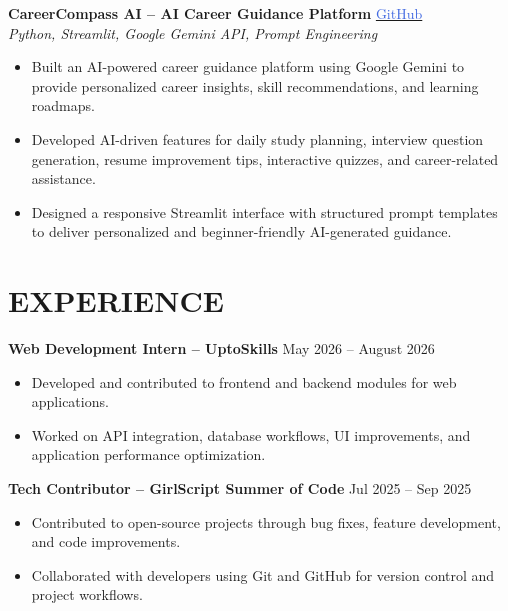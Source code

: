 \documentclass[a4paper,10pt]{article}
\begin{document}
\textbf{CareerCompass AI -- AI Career Guidance Platform}
\hfill
\href{https://github.com/ddikshamitraa25/CareerCompass-AI}{\textcolor{RoyalBlue}{GitHub}}
\\
\textit{Python, Streamlit, Google Gemini API, Prompt Engineering}
\begin{itemize}
\item Built an AI-powered career guidance platform using Google Gemini to provide personalized career insights, skill recommendations, and learning roadmaps.
\item Developed AI-driven features for daily study planning, interview question generation, resume improvement tips, interactive quizzes, and career-related assistance.
\item Designed a responsive Streamlit interface with structured prompt templates to deliver personalized and beginner-friendly AI-generated guidance.
\end{itemize}


\section*{EXPERIENCE}

\textbf{Web Development Intern -- UptoSkills} \hfill May 2026 -- August 2026

\begin{itemize}

\item Developed and contributed to frontend and backend modules for web applications.

\item Worked on API integration, database workflows, UI improvements, and application performance optimization.

\end{itemize}

\textbf{Tech Contributor -- GirlScript Summer of Code} \hfill Jul 2025 -- Sep 2025

\begin{itemize}

\item Contributed to open-source projects through bug fixes, feature development, and code improvements.

\item Collaborated with developers using Git and GitHub for version control and project workflows.

\end{itemize}
\end{document}

